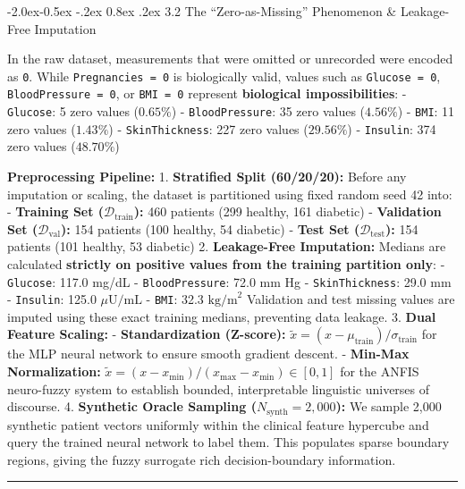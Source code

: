 \documentclass[10pt,a4paper]{article}
\makeatletter
\renewcommand\subsubsection{\@startsection{subsubsection}{3}{\z@}%
                                     {-2.0ex\@plus -0.5ex \@minus -.2ex}%
                                     {0.8ex \@plus .2ex}%
                                     {\normalfont\normalsize\bfseries\color{accent}}}
\makeatother
\begin{document}
\subsubsection{3.2 The ``Zero-as-Missing'' Phenomenon \& Leakage-Free
Imputation}\label{the-zero-as-missing-phenomenon-leakage-free-imputation}

In the raw dataset, measurements that were omitted or unrecorded were
encoded as \texttt{0}. While \texttt{Pregnancies\ =\ 0} is biologically
valid, values such as \texttt{Glucose\ =\ 0},
\texttt{BloodPressure\ =\ 0}, or \texttt{BMI\ =\ 0} represent
\textbf{biological impossibilities}: - \texttt{Glucose}: 5 zero values
(\(0.65\%\)) - \texttt{BloodPressure}: 35 zero values (\(4.56\%\)) -
\texttt{BMI}: 11 zero values (\(1.43\%\)) - \texttt{SkinThickness}: 227
zero values (\(29.56\%\)) - \texttt{Insulin}: 374 zero values
(\(48.70\%\))

\textbf{Preprocessing Pipeline:} 1. \textbf{Stratified Split
(60/20/20):} Before any imputation or scaling, the dataset is
partitioned using fixed random seed 42 into: - \textbf{Training Set
(\(\mathcal{D}_{\text{train}}\)):} 460 patients (299 healthy, 161
diabetic) - \textbf{Validation Set (\(\mathcal{D}_{\text{val}}\)):} 154
patients (100 healthy, 54 diabetic) - \textbf{Test Set
(\(\mathcal{D}_{\text{test}}\)):} 154 patients (101 healthy, 53
diabetic) 2. \textbf{Leakage-Free Imputation:} Medians are calculated
\textbf{strictly on positive values from the training partition only}: -
\texttt{Glucose}: 117.0 mg/dL - \texttt{BloodPressure}: 72.0 mm Hg -
\texttt{SkinThickness}: 29.0 mm - \texttt{Insulin}: 125.0
\(\mu\text{U/mL}\) - \texttt{BMI}: 32.3 \(\text{kg/m}^2\) Validation and
test missing values are imputed using these exact training medians,
preventing data leakage. 3. \textbf{Dual Feature Scaling:} -
\textbf{Standardization (Z-score):}
\(\tilde{x} = (x - \mu_{\text{train}}) / \sigma_{\text{train}}\) for the
MLP neural network to ensure smooth gradient descent. - \textbf{Min-Max
Normalization:}
\(\tilde{x} = (x - x_{\text{min}}) / (x_{\text{max}} - x_{\text{min}}) \in [0, 1]\)
for the ANFIS neuro-fuzzy system to establish bounded, interpretable
linguistic universes of discourse. 4. \textbf{Synthetic Oracle Sampling
(\(N_{\text{synth}} = 2{,}000\)):} We sample 2,000 synthetic patient
vectors uniformly within the clinical feature hypercube and query the
trained neural network to label them. This populates sparse boundary
regions, giving the fuzzy surrogate rich decision-boundary information.

\begin{center}\rule{0.5\linewidth}{0.5pt}\end{center}
\end{document}

